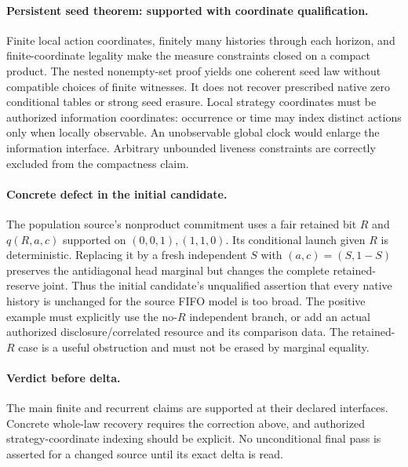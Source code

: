 \documentclass{article}\usepackage{amsmath,amssymb,url}
\begin{document}
\paragraph{Persistent seed theorem: supported with coordinate qualification.} Finite local action coordinates, finitely many histories through each horizon, and finite-coordinate legality make the measure constraints closed on a compact product. The nested nonempty-set proof yields one coherent seed law without compatible choices of finite witnesses. It does not recover prescribed native zero conditional tables or strong seed erasure. Local strategy coordinates must be authorized information coordinates: occurrence or time may index distinct actions only when locally observable. An unobservable global clock would enlarge the information interface. Arbitrary unbounded liveness constraints are correctly excluded from the compactness claim.

\paragraph{Concrete defect in the initial candidate.} The population source's nonproduct commitment uses a fair retained bit $R$ and $q(R,a,c)$ supported on $(0,0,1),(1,1,0)$. Its conditional launch given $R$ is deterministic. Replacing it by a fresh independent $S$ with $(a,c)=(S,1-S)$ preserves the antidiagonal head marginal but changes the complete retained-reserve joint. Thus the initial candidate's unqualified assertion that every native history is unchanged for the source FIFO model is too broad. The positive example must explicitly use the no-$R$ independent branch, or add an actual authorized disclosure/correlated resource and its comparison data. The retained-$R$ case is a useful obstruction and must not be erased by marginal equality.

\paragraph{Verdict before delta.} The main finite and recurrent claims are supported at their declared interfaces. Concrete whole-law recovery requires the correction above, and authorized strategy-coordinate indexing should be explicit. No unconditional final pass is asserted for a changed source until its exact delta is read.
\end{document}
